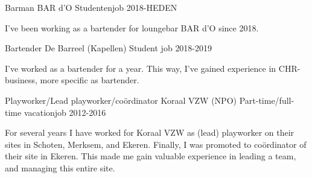 
\begin{cventries}

    
    \cventry
    {Barman} %
    {BAR d'O} %
    {Studentenjob} %
    {2018-HEDEN} %
    {
      \begin{cvitems} %
        \item {I've been working as a bartender for loungebar BAR d'O since 2018. }
      \end{cvitems}
    }
       
    \cventry
    {Bartender} %
    {De Barreel (Kapellen)} %
    {Student job} %
    {2018-2019} %
    {
      \begin{cvitems} %
              \item {I've worked as a bartender for a year. This way, I've gained experience in CHR-business, more specific as bartender.}
      \end{cvitems}
    }
    
    \cventry
    {Playworker/Lead playworker/coördinator} %
    {Koraal VZW (NPO)} %
    {Part-time/full-time vacationjob} %
    {2012-2016} %
    {
      \begin{cvitems} %
              \item {For several years I have worked for Koraal VZW as (lead) playworker on their sites in Schoten, Merksem, and Ekeren. Finally, I was promoted to coördinator of their site in Ekeren. This made me gain valuable experience in leading a team, and managing this entire site.}
      \end{cvitems}
    }
    
\end{cventries}
